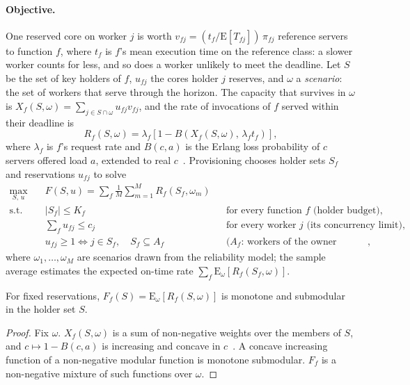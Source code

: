 \paragraph{Objective.}
One reserved core on worker $j$ is worth $v_{fj} = (t_f / \mathrm{E}[T_{fj}])\,\pi_{fj}$ reference servers to
function $f$, where $t_f$ is $f$'s mean execution time on the reference class: a slower worker counts for less, and so
does a worker unlikely to meet the deadline. Let $S$ be the set of key holders of $f$, $u_{fj}$ the cores holder $j$
reserves, and $\omega$ a \emph{scenario}: the set of workers that serve through the horizon. The capacity that
survives in $\omega$ is $X_f(S,\omega) = \sum_{j \in S \cap \omega} u_{fj} v_{fj}$, and the rate of invocations of $f$
served within their deadline is
\begin{equation}
R_f(S,\omega) = \lambda_f \left[ 1 - B\!\left(X_f(S,\omega),\, \lambda_f t_f\right) \right],
\label{eq:rate}
\end{equation}
where $\lambda_f$ is $f$'s request rate and $B(c,a)$ is the Erlang loss probability of $c$ servers offered load $a$,
extended to real $c$~\cite{jagers1986erlang}. Provisioning chooses holder sets $S_f$ and reservations $u_{fj}$ to
solve
\begin{equation}
\begin{aligned}
\max_{S,\,u}\quad & F(S,u) = \sum_f \frac{1}{M} \sum_{m=1}^{M} R_f(S_f,\omega_m) \\
\text{s.t.}\quad & |S_f| \le K_f && \text{for every function } f \text{ (holder budget)},\\
& \textstyle\sum_f u_{fj} \le c_j && \text{for every worker } j \text{ (its concurrency limit)},\\
& u_{fj} \ge 1 \iff j \in S_f, \quad S_f \subseteq A_f && \text{(}A_f\text{: workers of the owner classes the tenant allows)},
\end{aligned}
\label{eq:prov}
\end{equation}
where $\omega_1,\dots,\omega_M$ are scenarios drawn from the reliability model; the sample average estimates the
expected on-time rate $\sum_f \mathrm{E}_\omega[R_f(S_f,\omega)]$.

\begin{proposition}
\label{prop:submodular}
For fixed reservations, $F_f(S) = \mathrm{E}_\omega[R_f(S,\omega)]$ is monotone and submodular in the holder set $S$.
\end{proposition}
\begin{proof}
Fix $\omega$. $X_f(S,\omega)$ is a sum of non-negative weights over the members of $S$, and $c \mapsto 1 - B(c,a)$ is
increasing and concave in $c$~\cite{messerli1972,jagers1986erlang}. A concave increasing function of a non-negative
modular function is monotone submodular. $F_f$ is a non-negative mixture of such functions over $\omega$.
\end{proof}

